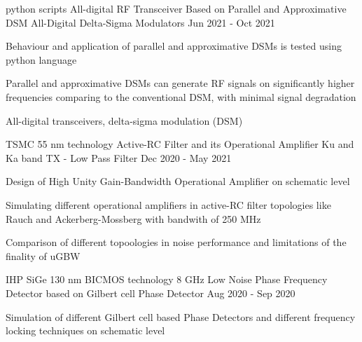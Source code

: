 \begin{cventries}

\cventry
{python scripts} %
{All-digital RF Transceiver Based on Parallel and Approximative DSM} %
{All-Digital Delta-Sigma Modulators} %
{Jun 2021 - Oct 2021} %
{ %
\begin{cvitems}
    \item {Behaviour and application of parallel and approximative DSMs is tested using python language}
    \item {Parallel and approximative DSMs can generate RF signals on significantly higher frequencies comparing to the conventional DSM, with minimal signal degradation}
    \item {All-digital transceivers, delta-sigma modulation (DSM)}
\end{cvitems}
}


\cventry
{TSMC 55 nm technology} %
{Active-RC Filter and its Operational Amplifier} %
{Ku and Ka band TX - Low Pass Filter} %
{Dec 2020 - May 2021} %
{ %
\begin{cvitems}
    \item {Design of High Unity Gain-Bandwidth Operational Amplifier on schematic level}
    \item {Simulating different operational amplifiers in active-RC filter topologies like Rauch and Ackerberg-Mossberg with bandwith of 250 MHz}
    \item {Comparison of different topoologies in noise performance and limitations of the finality of uGBW}
\end{cvitems} 
}


\cventry
{IHP SiGe 130 nm BICMOS technology} %
{8 GHz Low Noise Phase Frequency Detector based on Gilbert cell} %
{Phase Detector} %
{Aug 2020 - Sep 2020} %
{ %
\begin{cvitems}
    \item {Simulation of different Gilbert cell based Phase Detectors and different frequency locking techniques on schematic level}
\end{cvitems} 
}



\end{cventries}
